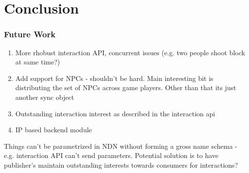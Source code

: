 \chapter{Conclusion}

\subsection{Future Work}\label{sec:conc:fw}
\begin{enumerate}
    \item More rhobust interaction API, concurrent issues (e.g. two people shoot block at same time?)
    \item Add support for NPCs - shouldn't be hard. Main interesting bit is distributing the set of NPCs across game players. Other than that its just another sync object
    \item Outstanding interaction interest as described in the interaction api 
    \item IP based backend module
\end{enumerate}


Things can't be parametrized in NDN without forming a gross name schema - e.g. interaction API can't send parameters. Potential solution is to have publisher's maintain outstanding interests towards consumers for interactions?